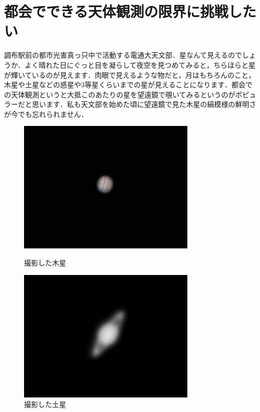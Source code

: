 \documentclass[../../super_nova_2023]{subfiles}
\begin{document}
\section{都会でできる天体観測の限界に挑戦したい}
調布駅前の都市光害真っ只中で活動する電通大天文部．星なんて見えるのでしょうか．よく晴れた日にぐっと目を凝らして夜空を見つめてみると，ちらほらと星が輝いているのが見えます．肉眼で見えるような物だと，月はもちろんのこと，木星や土星などの惑星や3等星くらいまでの星が見えることになります．都会での天体観測というと大抵このあたりの星を望遠鏡で覗いてみるというのがポピュラーだと思います．私も天文部を始めた頃に望遠鏡で見た木星の縞模様の鮮明さが今でも忘れられません．
\begin{figure}[H]
	\centering
	\begin{minipage}{0.4\columnwidth}
		\centering
		\includegraphics[width=\columnwidth]{figures/Yosuke/Jupiter.jpg}
		\caption{撮影した木星}
		\label{fig:jupiter}
	\end{minipage}
	\begin{minipage}{0.4\columnwidth}
		\centering
		\includegraphics[width=\columnwidth]{figures/Yosuke/Saturn.jpg}
		\caption{撮影した土星}
		\label{fig:saturn}
	\end{minipage}
\end{figure}
\end{document}

